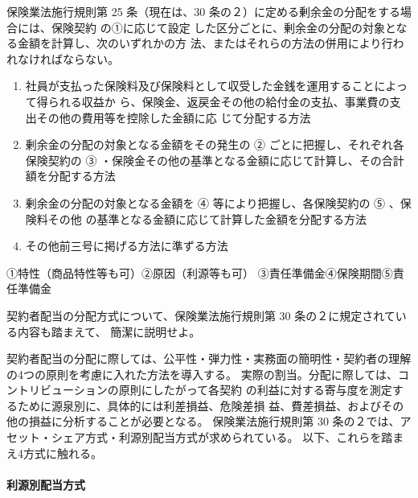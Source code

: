 \documentclass[report,gutter=10mm,fore-edge=10mm,uplatex,dvipdfmx]{jlreq}
\begin{document}
保険業法施行規則第 25 条（現在は、30 条の２）に定める剰余金の分配をする場合には、保険契約
の①に応じて設定 した区分ごとに、剰余金の分配の対象となる金額を計算し、次のいずれかの方
法、またはそれらの方法の併用により行われなければならない。

\begin{enumerate} [1]
 \item 
 社員が支払った保険料及び保険料として収受した金銭を運用することによって得られる収益か
 ら、保険金、返戻金その他の給付金の支払、事業費の支出その他の費用等を控除した金額に応
 じて分配する方法
 \item 
 剰余金の分配の対象となる金額をその発生の ② ごとに把握し、それぞれ各保険契約の
 ③ ・保険金その他の基準となる金額に応じて計算し、その合計額を分配する方法
 \item 
 剰余金の分配の対象となる金額を ④ 等により把握し、各保険契約の
 ⑤ 、保険料その他 の基準となる金額に応じて計算した金額を分配する方法
 \item 
 その他前三号に掲げる方法に準ずる方法
\end{enumerate}

①特性（商品特性等も可）②原因（利源等も可）
③責任準備金④保険期間⑤責任準備金

 契約者配当の分配方式について、保険業法施行規則第 30 条の２に規定されている内容も踏まえて、
 簡潔に説明せよ。


契約者配当の分配に際しては、公平性・弾力性・実務面の簡明性・契約者の理解の4つの原則を考慮に入れた方法を導入する。
実際の割当。分配に際しては、コントリビューションの原則にしたがって各契約
の利益に対する寄与度を測定するために源泉別に、具体的には利差損益、危険差損
益、費差損益、およびその他の損益に分析することが必要となる。
保険業法施行規則第 30 条の２では、アセット・シェア方式・利源別配当方式が求められている。
以下、これらを踏まえ4方式に触れる。

\paragraph{利源別配当方式}
\end{document}
